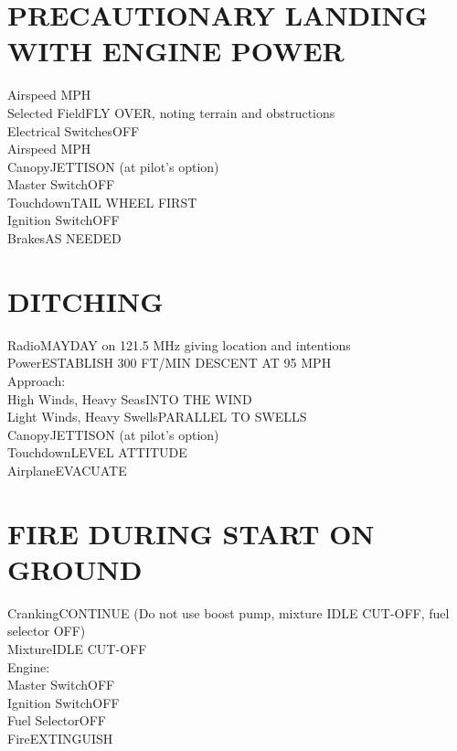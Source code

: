 \documentclass{article}
\begin{document}
\begin{multicols*}{2}
\section*{PRECAUTIONARY LANDING WITH ENGINE POWER}
Airspeed MPH\\
Selected Field\dotfill FLY OVER, noting terrain and obstructions\\
Electrical Switches\dotfill OFF\\
Airspeed MPH\\
Canopy\dotfill JETTISON (at pilot's option)\\
Master Switch\dotfill OFF\\
Touchdown\dotfill TAIL WHEEL FIRST\\
Ignition Switch\dotfill OFF\\
Brakes\dotfill AS NEEDED
\section*{DITCHING}
Radio\dotfill MAYDAY on 121.5 MHz giving location and intentions\\
Power\dotfill ESTABLISH 300 FT/MIN DESCENT AT 95 MPH\\
Approach:\\
\hspace*{6mm}High Winds, Heavy Seas\dotfill INTO THE WIND\\
\hspace*{6mm}Light Winds, Heavy Swells\dotfill PARALLEL TO SWELLS\\
Canopy\dotfill JETTISON (at pilot's option)\\
Touchdown\dotfill LEVEL ATTITUDE\\
Airplane\dotfill EVACUATE
\section*{FIRE DURING START ON GROUND}
Cranking\dotfill CONTINUE (Do not use boost pump, mixture IDLE CUT-OFF, fuel selector OFF)\\
Mixture\dotfill IDLE CUT-OFF\\
Engine:\\
\hspace*{6mm}Master Switch\dotfill OFF\\
\hspace*{6mm}Ignition Switch\dotfill OFF\\
\hspace*{6mm}Fuel Selector\dotfill OFF\\
Fire\dotfill EXTINGUISH

\end{multicols*}
\end{document}
